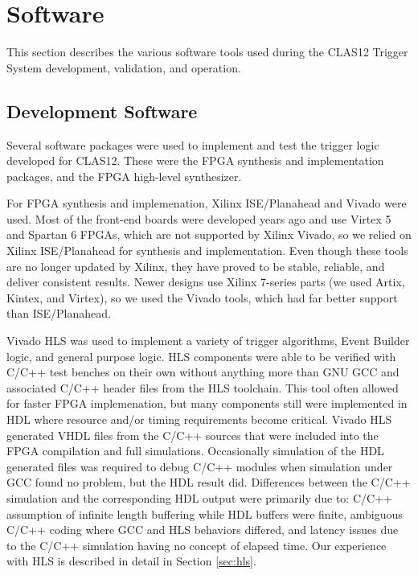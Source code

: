 \section{Software}

This section describes the various software tools used during the CLAS12 Trigger System development, validation, and operation.

\subsection{Development Software}

Several software packages were used to implement and test the trigger logic developed for CLAS12. These were the FPGA synthesis and implementation packages, and the FPGA high-level synthesizer.

For FPGA synthesis and implemenation, Xilinx ISE/Planahead and Vivado were used. Most of the front-end boards were developed years ago and use Virtex 5 and Spartan 6 FPGAs, which are not supported by Xilinx Vivado, so we relied on Xilinx ISE/Planahead for synthesis and implementation. Even though these tools are no longer updated by Xilinx, they have proved to be stable, reliable, and deliver consistent results. Newer designs use Xilinx 7-series parts (we used Artix, Kintex, and Virtex), so we used the Vivado tools, which had far better support than ISE/Planahead.

Vivado HLS was used to implement a variety of trigger algorithms, Event Builder logic, and general purpose logic. HLS components were able to be verified with C/C++ test benches on their own without anything more than GNU GCC and associated C/C++ header files from the HLS toolchain. This tool often allowed for faster FPGA implemenation, but many components still were implemented in HDL where resource and/or timing requirements become critical. Vivado HLS generated VHDL files from the C/C++ sources that were included into the FPGA compilation and full simulations. Occasionally simulation of the HDL generated files was required to debug C/C++ modules when simulation under GCC found no problem, but the HDL result did. Differences between the C/C++ simulation and the corresponding HDL output were primarily due to: C/C++ assumption of infinite length buffering while HDL buffers were finite, ambiguous C/C++ coding where GCC and HLS behaviors differed, and latency issues due to the C/C++ simulation having no concept of elapsed time. Our experience with HLS is described in detail in Section \ref{sec:hls}.

